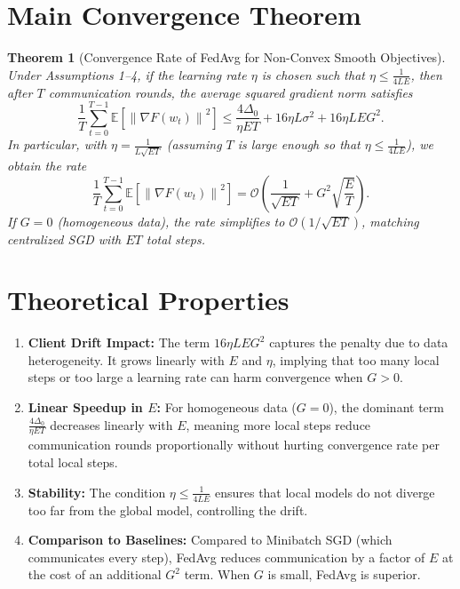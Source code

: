 \documentclass{article}
\newtheorem{theorem}{Theorem}
\newcommand{\norm}[1]{\left\| #1 \right\|}
\begin{document}
\section*{Main Convergence Theorem}
\begin{theorem}[Convergence Rate of FedAvg for Non-Convex Smooth Objectives]
Under Assumptions 1--4, if the learning rate $\eta$ is chosen such that $\eta \le \frac{1}{4LE}$, then after $T$ communication rounds, the average squared gradient norm satisfies
\begin{equation}
    \frac{1}{T} \sum_{t=0}^{T-1} \mathbb{E} \left[ \norm{\nabla F(w_t)}^2 \right] \le \frac{4\Delta_0}{\eta E T} + 16\eta L \sigma^2 + 16\eta L E G^2.
\end{equation}
In particular, with $\eta = \frac{1}{L\sqrt{E T}}$ (assuming $T$ is large enough so that $\eta \le \frac{1}{4LE}$), we obtain the rate
\begin{equation}
    \frac{1}{T} \sum_{t=0}^{T-1} \mathbb{E} \left[ \norm{\nabla F(w_t)}^2 \right] = \mathcal{O} \left( \frac{1}{\sqrt{E T}} + G^2 \sqrt{\frac{E}{T}} \right).
\end{equation}
If $G=0$ (homogeneous data), the rate simplifies to $\mathcal{O}(1/\sqrt{ET})$, matching centralized SGD with $ET$ total steps.
\end{theorem}

\section*{Theoretical Properties}
\begin{enumerate}
    \item \textbf{Client Drift Impact:} The term $16\eta L E G^2$ captures the penalty due to data heterogeneity. It grows linearly with $E$ and $\eta$, implying that too many local steps or too large a learning rate can harm convergence when $G>0$.
    \item \textbf{Linear Speedup in $E$:} For homogeneous data ($G=0$), the dominant term $\frac{4\Delta_0}{\eta E T}$ decreases linearly with $E$, meaning more local steps reduce communication rounds proportionally without hurting convergence rate per total local steps.
    \item \textbf{Stability:} The condition $\eta \le \frac{1}{4LE}$ ensures that local models do not diverge too far from the global model, controlling the drift.
    \item \textbf{Comparison to Baselines:} Compared to Minibatch SGD (which communicates every step), FedAvg reduces communication by a factor of $E$ at the cost of an additional $G^2$ term. When $G$ is small, FedAvg is superior.
\end{enumerate}
\end{document}
